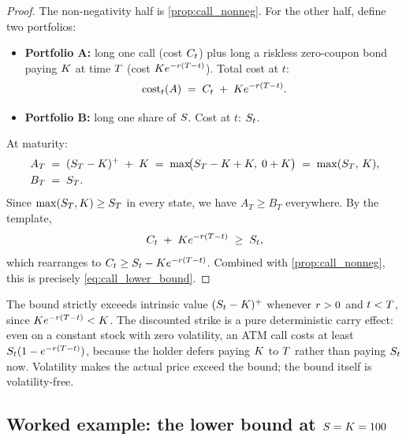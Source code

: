 \begin{proof}
The non-negativity half is \cref{prop:call_nonneg}. For the other
half, define two portfolios:
\begin{itemize}
  \item \textbf{Portfolio A:} long one call (cost $C_t$) plus
  long a riskless zero-coupon bond paying $K$ at time
  $T$ (cost $K e^{-r(T-t)}$). Total cost at
  $t$:
  \begin{equation*}
    \text{cost}_t(A) \;=\; C_t \;+\; K e^{-r(T - t)}.
  \end{equation*}
  \item \textbf{Portfolio B:} long one share of $S$. Cost at
  $t$: $S_t$.
\end{itemize}
At maturity:
\begin{align*}
  A_T \;&=\; (S_T - K)^+ \;+\; K
        \;=\; \max\!\bigl(S_T - K + K,\; 0 + K\bigr)
        \;=\; \max(S_T,\, K), \\
  B_T \;&=\; S_T.
\end{align*}
Since $\max(S_T, K) \geq S_T$ in every state, we
have $A_T \geq B_T$ everywhere. By the template,
\begin{equation*}
  C_t \;+\; K e^{-r(T - t)} \;\geq\; S_t,
\end{equation*}
which rearranges to
$C_t \geq S_t - K e^{-r(T - t)}$. Combined
with \cref{prop:call_nonneg}, this is precisely
\eqref{eq:call_lower_bound}.
\end{proof}

The bound strictly exceeds intrinsic value $(S_t - K)^+$
whenever $r > 0$ and $t < T$, since
$K e^{-r(T - t)} < K$. The discounted
strike is a pure deterministic carry effect: even on a constant
stock with zero volatility, an ATM call costs at least
$S_t(1 - e^{-r(T-t)})$, because the holder defers
paying $K$ to $T$ rather than paying $S_t$ now.
Volatility makes the actual price exceed the bound; the bound
itself is volatility-free.

\subsection{Worked example: the lower bound at $S = K = 100$}
\label{sec:ch14_lower_example}

